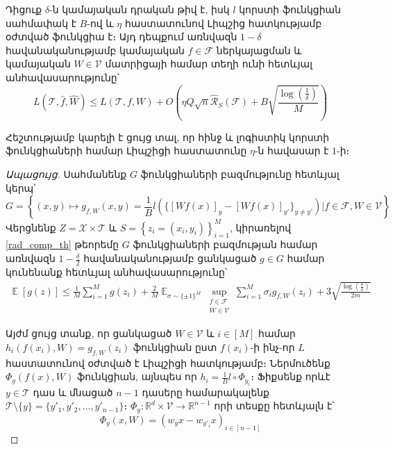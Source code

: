 \documentclass[12pt]{article}
\DeclareMathOperator*{\E}{\mathbb{E}}
\begin{document}
\begin{lemma}
\label{rad_lemma_main}
Դիցուք $\delta$-ն կամայական դրական թիվ է, իսկ $l$ կորստի ֆունկցիան սահմափակ է $B$-ով և $\eta$ հաստատունով Լիպշից հատկությամբ օժտված ֆունկցիա է։ Այդ դեպքում առնվազն $1-\delta$ հավանականությամբ կամայական $f \in \mathcal{F}$ ներկայացման և կամայական $W \in \mathcal{V}$ մատրիցայի համար տեղի ունի հետևյալ անհավասարությունը՝
$$L(\mathcal{T}, \hat{f}, \hat{W}) \leq L(\mathcal{T}, f, W) +O\left( \eta Q\sqrt{n} \hat{\mathcal{R}}_S(\mathcal{F})+    B\sqrt{\frac{\log \left( \frac{1}{\delta} \right)}{M}} \right)$$
\end{lemma}
 Հեշտությամբ կարելի է ցույց տալ, որ հինջ և լոգիստիկ կորստի ֆունկցիաների համար Լիպշիցի հաստատունը $\eta$-ն հավասար  է $1$-ի։
\begin{proof}[Ապացույց]
   Սահմանենք $G$ ֆունկցիաների բազմությունը հետևյալ կերպ՝
$$G = \left \{ (x, y) \mapsto  g_{f, W}(x, y) = \frac{1}{B}l(\{[Wf(x)]_y - [Wf(x)]_{y'}\}_{y\neq y'}   ) | f \in \mathcal{F}, W \in \mathcal{V} \right \}$$
Վերցնենք $Z = \mathcal{X} \times \mathcal{T}$ և $S = \left \{z_i = (x_i, y_i) \right \}_{i=1}^M$, կիրառելով \ref{rad_comp_th} թեորեմը $G$ ֆունկցիաների բազմության համար առնվազն $1-\frac{\delta}{2}$ հավանականությամբ ցանկացած $g \in G$ համար կունենանք հետևյալ անհավասարությունը՝
\begin{align}
\label{rad_ineq_1}
\E[g(z)] \leq \frac{1}{M}\sum_{i=1}^Mg(z_i) + \frac{2}{M}\E_{\sigma \sim \{\pm1\}^M} \sup_{\substack{ f  \in \mathcal{F}  \\ W \in \mathcal{V}}}\sum_{i=1}^M \sigma_ig_{f,W}(z_i) +    3\sqrt{\frac{\log \left( \frac{4}{\delta} \right)}{2m}}
\end{align}

Այժմ ցույց տանք, որ ցանկացած $W \in \mathcal{V}$  և $i \in [M]$ համար $h_i(f(x_i), W) = g_{f,W}(z_i)$ ֆունկցիան ըստ $f(x_i)$-ի ինչ-որ $L$ հաստատունով օժտված է Լիպշիցի հատկությամբ։ Ներմուծենք $\Phi_y(f(x), W)$ ֆունկցիան, այնպես որ $h_i = \frac{1}{B} l \circ \Phi_{y_i}$։ Ֆիքսենք որևէ $y \in \mathcal{T}$ դաս և մնացած $n-1$ դասերը համարակալենք  $\mathcal{T} \setminus \{y\} =\{y'_1, y'_2, ..., y'_{n-1}\} $։ $\Phi_y : \mathbb{R}^d \times \mathcal{V} \rightarrow \mathbb{R}^{n-1}$ որի տեսքը հետևյալն է՝
$$\Phi_y(x, W) = (w_yx-w_{y'_{i}}x)_{i \in [n-1]}$$


\end{proof}
\end{document}

